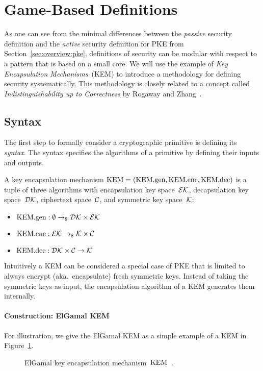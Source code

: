 \section{Game-Based Definitions}
As one can see from the minimal differences between the \emph{passive} security definition and the \emph{active} security definition for PKE from Section~\ref{sec:overview:pke}, definitions of security can be modular with respect to a pattern that is based on a small core.
We will use the example of \emph{Key Encapsulation Mechanisms}~(KEM) to introduce a methodology for defining security systematically.
This methodology is closely related to a concept called \emph{Indistinguishability up to Correctness} by Rogaway and Zhang~\cite{C:RogZha18}.

\subsection{Syntax}
The first step to formally consider a cryptographic primitive is defining its \emph{syntax}.
The syntax specifies the algorithms of a primitive by defining their inputs and outputs.

A key encapsulation mechanism $\mathrm{KEM}=(\mathrm{KEM}.\mathrm{gen},\mathrm{KEM}.\mathrm{enc},\mathrm{KEM}.\mathrm{dec})$ is a tuple of three algorithms with encapsulation key space~$\mathcal{EK}$, decapsulation key space~$\mathcal{DK}$, ciphertext space~$\mathcal{C}$, and symmetric key space~$\mathcal{K}$:
\begin{itemize}
    \item $\mathrm{KEM}.\mathrm{gen}: \emptyset \to_\$ \mathcal{DK}\times\mathcal{EK}$
    \item $\mathrm{KEM}.\mathrm{enc}: \mathcal{EK} \to_\$ \mathcal{K}\times\mathcal{C}$
    \item $\mathrm{KEM}.\mathrm{dec}: \mathcal{DK}\times\mathcal{C} \to \mathcal{K}$
\end{itemize}

Intuitively a KEM can be considered a special case of PKE that is limited to always encrypt (aka.\ encapsulate) fresh symmetric keys.
Instead of taking the symmetric keys as input, the encapsulation algorithm of a KEM generates them internally.

\paragraph{Construction: ElGamal KEM}
For illustration, we give the ElGamal KEM as a simple example of a KEM in Figure~\ref{fig:kem:const:elgamal}.

\begin{figure}[!ht]
    \centering
    \nicoresetlinenr%
    \fbox{%
        \scalebox{\codescalefactor}{%
        }%
    }
    \caption{%
        ElGamal key encapsulation mechanism~$\mathrm{KEM}$~\cite{ElGamal85}.
    }
    \label{fig:kem:const:elgamal}
\end{figure}

